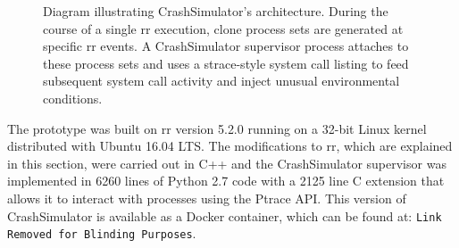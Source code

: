 \begin{figure}[t]
  \center{}
  \caption{Diagram illustrating CrashSimulator's architecture.  During the
    course of a single rr execution, clone process sets are generated at
    specific rr events.  A CrashSimulator supervisor process attaches to
    these process sets and uses a strace-style system call listing to feed
    subsequent system call activity and inject unusual environmental
    conditions.}
  \label{figure:architecture}
\end{figure}

The prototype was built on rr version 5.2.0 running on a 32-bit Linux kernel
distributed with Ubuntu 16.04 LTS.  The modifications to rr, which are
explained in this section, were carried out in C++ and the CrashSimulator
supervisor was implemented in 6260 lines of Python 2.7 code with a 2125
line C extension that allows it to interact with processes using the Ptrace
API.
This version of CrashSimulator is available as a Docker container, which
can be found at: {\tt Link Removed for Blinding Purposes}.
